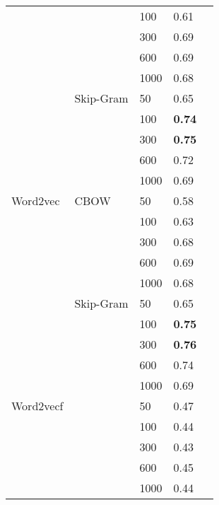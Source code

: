 \begin{table}[]
\begin{minipage}{.5\textwidth}
\begin{tabular}{@{}lllll@{}}
                 &               & 100  & 0.61             \\
                 &               & 300  & 0.69             \\
                 &               & 600  & 0.69             \\
                 &               & 1000 & 0.68             \\ \cmidrule(lr){2-4}
                 & Skip-Gram     & 50   & 0.65             \\
                 &               & 100  & \textbf{0.74}    \\
                 &               & 300  & \textbf{0.75}    \\
                 &               & 600  & 0.72             \\
                 &               & 1000 & 0.69             \\ \cmidrule(r){1-4}
Word2vec         & CBOW          & 50   & 0.58             \\
                 &               & 100  & 0.63             \\
                 &               & 300  & 0.68             \\
                 &               & 600  & 0.69             \\
                 &               & 1000 & 0.68             \\ \cmidrule(lr){2-4}
                 & Skip-Gram     & 50   & 0.65             \\
                 &               & 100  & \textbf{0.75}    \\
                 &               & 300  & \textbf{0.76}    \\
                 &               & 600  & 0.74             \\
                 &               & 1000 & 0.69             \\ \cmidrule(r){1-4}
Word2vecf        &               & 50   & 0.47             \\
                 &               & 100  & 0.44             \\
                 &               & 300  & 0.43             \\
                 &               & 600  & 0.45             \\
                 &               & 1000 & 0.44             \\ \cmidrule(r){1-4}
\end{tabular}
\end{minipage}
\end{table}



